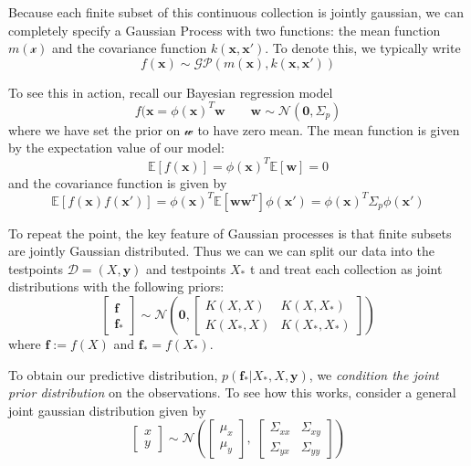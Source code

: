 Because each finite subset of this continuous collection is jointly gaussian, we can completely specify a Gaussian Process with two functions: the mean function $m(\mathcal{x})$ and the covariance function $k(\mathbf{x},\mathbf{x}')$. To denote this, we typically write
\begin{equation}
    f(\mathbf{x}) \sim \mathcal{GP}(m(\mathbf{x}), k(\mathbf{x},\mathbf{x}'))
\end{equation}

To see this in action, recall our Bayesian regression model
\begin{equation}
  f(\mathbf{x} = \phi(\mathbf{x})^T\mathbf{w} \qquad \mathbf{w}\sim\mathcal{N}(\mathbf{0}, \Sigma_p)
\end{equation}
where we have set the prior on $\mathcal{w}$ to have zero mean. The mean function is given by the expectation value of our model:
\begin{equation}
  \mathbb{E}[f(\mathbf{x})] = \phi(\mathbf{x})^T\mathbb{E}[\mathbf{w}] = 0
\end{equation}
and the covariance function is given by
\begin{equation}
  \mathbb{E}[f(\mathbf{x})f(\mathbf{x'})] = \phi(\mathbf{x})^T\mathbb{E}[\mathbf{w}\mathbf{w}^T]\phi(\mathbf{x}') = \phi(\mathbf{x})^T\Sigma_p\phi(\mathbf{x}')
\end{equation}

To repeat the point, the key feature of Gaussian processes is that finite subsets are jointly Gaussian distributed. Thus we can we can split our data into the testpoints $\mathcal{D}=(X,\mathbf{y})$ and testpoints $X_*$ t and treat each collection as joint distributions with the following priors:
\begin{equation}
  \begin{bmatrix} \mathbf{f} \\ \mathbf{f}_* \end{bmatrix} \sim \mathcal{N}\left(\mathbf{0},\begin{bmatrix} K(X,X) & K(X,X_*) \\ K(X_*,X) & K(X_*,X_*) \end{bmatrix}\right)
\end{equation}
where $\mathbf{f}:= f(X)$ and $\mathbf{f}_* = f(X_*)$.

To obtain our predictive distribution, $p(\mathbf{f}_* \vert X_*, X, \mathbf{y})$, we \textit{condition the joint prior distribution} on the observations. To see how this works, consider a general joint gaussian distribution given by
\begin{equation}
\begin{bmatrix} x \\ y \end{bmatrix} \sim \mathcal{N}\left( \begin{bmatrix}\mu_x \\ \mu_y\end{bmatrix},\; \begin{bmatrix} \Sigma_{xx} & \Sigma_{xy} \\ \Sigma_{yx} & \Sigma_{yy} \end{bmatrix}\right)
\end{equation}

